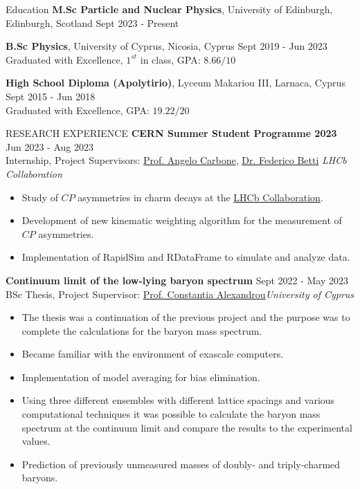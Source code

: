 \documentclass{resume} %
\begin{document}
\begin{rSection}{Education}
{\bf M.Sc Particle and Nuclear Physics}, University of Edinburgh, Edinburgh, Scotland \hfill {Sept 2023 - Present}

{\bf B.Sc Physics}, University of Cyprus, Nicosia, Cyprus \hfill {Sept 2019 - Jun 2023}\\
Graduated with Excellence, $1^{st}$ in class, GPA: $8.66/10$

{\bf High School Diploma (Apolytirio)}, Lyceum Makariou III, Larnaca, Cyprus \hfill {Sept 2015 - Jun 2018}\\
Graduated with Excellence, GPA: $19.22/20$
\end{rSection}

\bigbreak

\begin{rSection}{RESEARCH EXPERIENCE}
\textbf{CERN Summer Student Programme 2023} \hfill Jun 2023 - Aug 2023\\
Internship, Project Supervisors: \href{https://www.unibo.it/sitoweb/angelo.carbone/en}{Prof. Angelo Carbone}, \href{https://www.ph.ed.ac.uk/people/federico-betti}{Dr. Federico Betti}
\hfill \textit{LHCb Collaboration}
\begin{itemize}
\itemsep -3pt {}
\item Study of $CP$ asymmetries in charm decays at the \href{https://lhcb.web.cern.ch/}{LHCb Collaboration}.
\item Development of new kinematic weighting algorithm for the measurement of $CP$ asymmetries.
\item Implementation of RapidSim and RDataFrame to simulate and analyze data.
\end{itemize}

\textbf{Continuum limit of the low-lying baryon spectrum} \hfill Sept 2022 - May 2023\\
BSc Thesis, Project Supervisor:  \href{https://www.cyi.ac.cy/index.php/castorc/about-the-center/castorc-our-people/itemlist/user/99-constantia-alexandrou.html}{Prof. Constantia Alexandrou}\hfill \textit{University of Cyprus}
\begin{itemize}
\itemsep -3pt {} 
\item The thesis was a continuation of the previous project and the purpose was to complete the calculations for the baryon mass spectrum.
\item Became familiar with the environment of exascale computers.
\item Implementation of model averaging for bias elimination.
\item Using three different ensembles with different lattice spacings and various computational techniques it was possible to calculate the baryon mass spectrum at the continuum limit and compare the results to the experimental values.
\item Prediction of previously unmeasured masses of doubly- and triply-charmed baryons.
\end{itemize}


\end{rSection}
\end{document}

